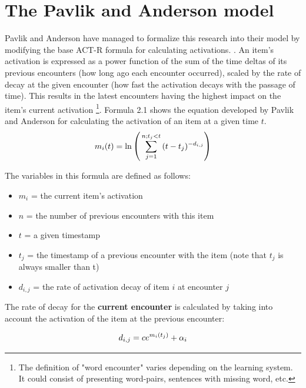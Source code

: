 \documentclass[a4paper]{report}
\begin{document}
\section{The Pavlik and Anderson model}
Pavlik and Anderson have managed to formalize this research into their model by modifying the base ACT-R formula for calculating activations. \cite{panderson05}. An item's activation is expressed as a power function of the sum of the time deltas of its previous encounters (how long ago each encounter occurred), scaled by the rate of decay at the given encounter (how fast the activation decays with the passage of time). This results in the latest encounters having the highest impact on the item's current activation \footnote{The definition of "word encounter" varies depending on the learning system. It could consist of presenting word-pairs, sentences with missing word, etc.}.
Formula 2.1 shows the equation developed by Pavlik and Anderson for calculating the activation of an item at a given time $t$. 
\begin{equation}
\begin{large}
\label{eq:activation}
m_i(t) = \ln{\Bigg(\sum_{j=1}^{n;t_j<t}{(t - t_j)^{-d_{i,j}}}\Bigg)}
\end{large}
\end{equation}

The variables in this formula are defined as follows:
\begin{itemize}
    \item $m_i$     = the current item's activation
    \item $n$       = the number of previous encounters with this item
    \item $t$       = a given timestamp
    \item $t_j$     = the timestamp of a previous encounter with the item (note that $t_j$ is always smaller than t)
    \item $d_{i,j}$ = the rate of activation decay of item $i$ at encounter $j$
\end{itemize}

The rate of decay for the \textbf{current encounter} is calculated by taking into account the activation of the item at the previous encounter:

\begin{equation}
\begin{large}
\label{eq:decay}
d_{i,j} = ce^{m_i(t_j)} + \alpha_i
\end{large}
\end{equation}
\end{document}
